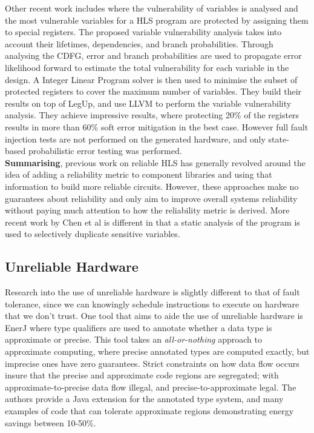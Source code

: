 Other recent work includes \cite{chen2014reliability} where the vulnerability of variables is analysed and the most vulnerable
variables for a HLS program are protected by assigning them to special registers.
The proposed variable vulnerability analysis takes into account their lifetimes, dependencies, and branch probabilities.
Through analysing the CDFG, error and branch probabilities are used to propagate error likelihood forward to estimate the total
vulnerability for each variable in the design.
A Integer Linear Program solver is then used to minimise the subset of protected registers to cover the maximum number of variables.
They build their results on top of LegUp, and use LLVM to perform the variable vulnerability analysis.
They achieve impressive results, where protecting 20\% of the registers results in more than 60\% soft error mitigation in the best case.
However full fault injection tests are not performed on the generated hardware, and only state-based probabilistic error testing
was performed.\\

\textbf{Summarising}, previous work on reliable HLS has generally revolved around the idea of adding a
reliability metric to component libraries and using that information to build more reliable circuits.
However, these approaches make no guarantees about reliability and only aim to improve overall
systems reliability without paying much attention to how the reliability metric is derived.
More recent work by Chen et al \cite{chen2014reliability} is different in that a static analysis of
the program is used to selectively duplicate sensitive variables.

\subsection{Unreliable Hardware}
Research into  the use of unreliable hardware is slightly different to that of
fault tolerance, since we can knowingly schedule instructions to execute on
hardware that we don't trust.
One tool that aims to aide the use of unreliable hardware is EnerJ \cite{sampson2011enerj} where type qualifiers are used to annotate
whether a data type is approximate or precise.
This tool takes an \emph{all-or-nothing} approach to approximate computing, where precise annotated types are computed exactly, but
imprecise ones have zero guarantees.
Strict constraints on how data flow occurs insure that the precise and approximate code regions are segregated; with
approximate-to-precise data flow illegal, and precise-to-approximate legal.
The authors provide a Java extension for the annotated type system, and many examples of code that can tolerate
approximate regions demonstrating energy savings between 10-50\%.

